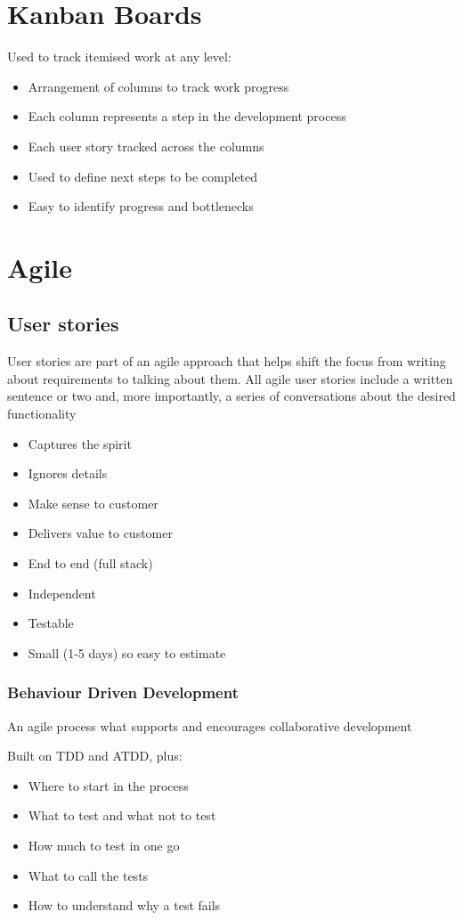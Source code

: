 \documentclass{article}[18pt]
\begin{document}
\section{Kanban Boards}
Used to track itemised work at any level:
\begin{itemize}
	\item Arrangement of columns to track work progress
	\item Each column represents a step in the development process
	\item Each user story tracked across the columns
	\item Used to define next steps to be completed
	\item Easy to identify progress and bottlenecks
\end{itemize}

\section{Agile}
\subsection{User stories}
\begin{defin}
User stories are part of an agile approach that helps shift the focus from writing about requirements to talking about them. All agile user stories include a written sentence or two and, more importantly, a series of conversations about the desired functionality
\end{defin}
\begin{itemize}
	\item Captures the spirit
	\item Ignores details
	\item Make sense to customer
	\item Delivers value to customer
	\item End to end (full stack)
	\item Independent
	\item Testable
	\item Small (1-5 days) so easy to estimate
\end{itemize}
\subsubsection{Behaviour Driven Development}
\begin{defin}
An agile process what supports and encourages collaborative development
\end{defin}
Built on TDD and ATDD, plus:
\begin{itemize}
	\item Where to start in the process
	\item What to test and what not to test
	\item How much to test in one go
	\item What to call the tests
	\item How to understand why a test fails
\end{itemize}
\end{document}
